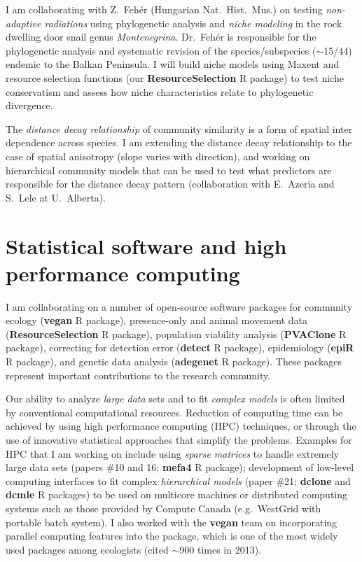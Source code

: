 I am collaborating with Z.~Feh\'{e}r (Hungarian Nat.~Hist.~Mus.) on testing \emph{non-adaptive radiations} using phylogenetic analysis and \emph{niche modeling} in the rock dwelling door snail genus \emph{Montenegrina}. Dr.~Feh\'{e}r is responsible for the phylogenetic analysis and systematic revision of the species/subspecies ($\sim$15/44) endemic to the Balkan Peninsula. I will build niche models using Maxent and resource selection functions (our \textbf{ResourceSelection} R package) to test niche conservatism and assess how niche characteristics relate to phylogenetic divergence. 
\vspace{0.5pc}

The \emph{distance decay relationship} of community similarity is a form of spatial inter dependence across species. I am extending the distance decay relationship to the case of spatial anisotropy (slope varies with direction), and working on hierarchical community models that can be used to test what predictors are responsible for the distance decay pattern (collaboration with E.~Azeria and S.~Lele at U.~Alberta).


\section{Statistical software and high performance computing} %

I am collaborating on a number of open-source software packages for community ecology (\textbf{vegan} R package), presence-only and animal movement data (\textbf{ResourceSelection} R package), population viability analysis (\textbf{PVAClone} R package), correcting for detection error (\textbf{detect} R package), epidemiology (\textbf{epiR} R package), and genetic data analysis (\textbf{adegenet} R package). These packages represent important contributions to the research community.
\vspace{0.5pc}

Our ability to analyze \emph{large data} sets and to fit \emph{complex models} is often limited by conventional computational resources. Reduction of computing time can be achieved by using high performance computing (HPC) techniques, or through the use of innovative statistical approaches that simplify the problems. Examples for HPC that I am working on include using \emph{sparse matrices} to handle extremely large data sets (papers \#10 and 16; \textbf{mefa4} R package); development of low-level computing interfaces to fit complex \emph{hierarchical models} (paper \#21; \textbf{dclone} and \textbf{dcmle} R packages) to be used on multicore machines or distributed computing systems such as those provided by Compute Canada (e.g.~WestGrid with portable batch system). I also worked with the \textbf{vegan} team on incorporating parallel computing features into the package, which is one of the most widely used packages among ecologists (cited $\sim$900 times in 2013).
\vspace{0.5pc}

